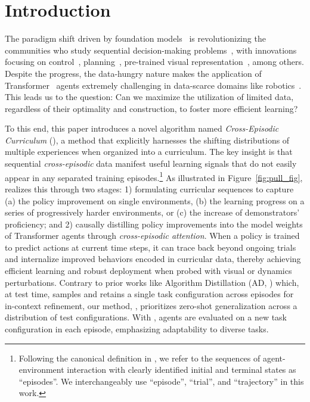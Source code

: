 \section{Introduction}
\label{sec:introduction}

The paradigm shift driven by foundation models~\citep{bommasani2021opportunities} is revolutionizing the communities who study sequential decision-making problems~\citep{yang2023foundation}, with innovations focusing on control~\citep{ahn2022saycan,liang2022code,jiang2022vima,brohan2022rt1}, planning~\citep{wang2023voyager,huang2022language,huang2022inner,wang2023describe,driess2023palme}, pre-trained visual representation~\citep{nair2022r3m,ma2022vip,radosavovic2022realworld,majumdar2023search}, among others.
Despite the progress, the data-hungry nature makes the application of Transformer~\citep{vaswani2017attention} agents extremely challenging in data-scarce domains like robotics~\citep{mandlekar2018roboturk,mandlekar2021matters,ebert2021bridge,jiang2022vima,brohan2022rt1}.
This leads us to the question: Can we maximize the utilization of limited data, regardless of their optimality and construction, to foster more efficient learning?

To this end, this paper introduces a novel algorithm named \textit{Cross-Episodic Curriculum} (\cec), a method that explicitly harnesses the shifting distributions of multiple experiences when organized into a curriculum.
The key insight is that sequential \textit{cross-episodic} data manifest useful learning signals that do not easily appear in any separated training episodes.\footnote{Following the canonical definition in \citet{sutton2018reinforcement}, we refer to the sequences of agent-environment interaction with clearly identified initial and terminal states as ``episodes''. We interchangeably use ``episode'', ``trial'', and ``trajectory'' in this work.}
As illustrated in Figure~\ref{fig:pull_fig}, \cec realizes this through two stages: 1) formulating curricular sequences to capture (a) the policy improvement on single environments, (b) the learning progress on a series of progressively harder environments, or (c) the increase of demonstrators' proficiency; 
and 2) causally distilling policy improvements into the model weights of Transformer agents through \emph{cross-episodic attention}.
When a policy is trained to predict actions at current time steps, it can trace back beyond ongoing trials and internalize improved behaviors encoded in curricular data, thereby achieving efficient learning and robust deployment when probed with visual or dynamics perturbations.
Contrary to prior works like Algorithm Distillation (AD, \citet{laskin2023incontext}) which, at test time, samples and retains a single task configuration across episodes for in-context refinement, our method, \cec, prioritizes zero-shot generalization across a distribution of test configurations. With \cec, agents are evaluated on a new task configuration in each episode, emphasizing adaptability to diverse tasks.

